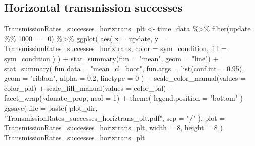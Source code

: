 \documentclass[
]{book}
\newenvironment{Shaded}{\begin{snugshade}}{\end{snugshade}}
\newcommand{\AttributeTok}[1]{\textcolor[rgb]{0.77,0.63,0.00}{#1}}
\newcommand{\DecValTok}[1]{\textcolor[rgb]{0.00,0.00,0.81}{#1}}
\newcommand{\FloatTok}[1]{\textcolor[rgb]{0.00,0.00,0.81}{#1}}
\newcommand{\FunctionTok}[1]{\textcolor[rgb]{0.00,0.00,0.00}{#1}}
\newcommand{\NormalTok}[1]{#1}
\newcommand{\OtherTok}[1]{\textcolor[rgb]{0.56,0.35,0.01}{#1}}
\newcommand{\SpecialCharTok}[1]{\textcolor[rgb]{0.00,0.00,0.00}{#1}}
\newcommand{\StringTok}[1]{\textcolor[rgb]{0.31,0.60,0.02}{#1}}
\begin{document}
\hypertarget{horizontal-transmission-successes-3}{%
\subsection{Horizontal transmission successes}\label{horizontal-transmission-successes-3}}

\begin{Shaded}
\begin{Highlighting}[]
\NormalTok{TransmissionRates\_successes\_horiztrans\_plt }\OtherTok{\textless{}{-}}\NormalTok{ time\_data }\SpecialCharTok{\%\textgreater{}\%}
  \FunctionTok{filter}\NormalTok{(update }\SpecialCharTok{\%\%} \DecValTok{1000} \SpecialCharTok{==} \DecValTok{0}\NormalTok{) }\SpecialCharTok{\%\textgreater{}\%}
  \FunctionTok{ggplot}\NormalTok{(}
    \FunctionTok{aes}\NormalTok{(}
      \AttributeTok{x =}\NormalTok{ update,}
      \AttributeTok{y =}\NormalTok{ TransmissionRates\_successes\_horiztrans,}
      \AttributeTok{color =}\NormalTok{ sym\_condition,}
      \AttributeTok{fill =}\NormalTok{ sym\_condition}
\NormalTok{    )}
\NormalTok{  ) }\SpecialCharTok{+}
  \FunctionTok{stat\_summary}\NormalTok{(}\AttributeTok{fun =} \StringTok{"mean"}\NormalTok{, }\AttributeTok{geom =} \StringTok{"line"}\NormalTok{) }\SpecialCharTok{+}
  \FunctionTok{stat\_summary}\NormalTok{(}
    \AttributeTok{fun.data =} \StringTok{"mean\_cl\_boot"}\NormalTok{,}
    \AttributeTok{fun.args =} \FunctionTok{list}\NormalTok{(}\AttributeTok{conf.int =} \FloatTok{0.95}\NormalTok{),}
    \AttributeTok{geom =} \StringTok{"ribbon"}\NormalTok{,}
    \AttributeTok{alpha =} \FloatTok{0.2}\NormalTok{,}
    \AttributeTok{linetype =} \DecValTok{0}
\NormalTok{  ) }\SpecialCharTok{+}
  \FunctionTok{scale\_color\_manual}\NormalTok{(}\AttributeTok{values =}\NormalTok{ color\_pal) }\SpecialCharTok{+}
  \FunctionTok{scale\_fill\_manual}\NormalTok{(}\AttributeTok{values =}\NormalTok{ color\_pal) }\SpecialCharTok{+}
  \FunctionTok{facet\_wrap}\NormalTok{(}\SpecialCharTok{\textasciitilde{}}\NormalTok{donate\_prop, }\AttributeTok{ncol =} \DecValTok{1}\NormalTok{) }\SpecialCharTok{+}
  \FunctionTok{theme}\NormalTok{(}
    \AttributeTok{legend.position =} \StringTok{"bottom"}
\NormalTok{  )}
\FunctionTok{ggsave}\NormalTok{(}
  \AttributeTok{file =} \FunctionTok{paste}\NormalTok{(}
\NormalTok{    plot\_dir,}
    \StringTok{"TransmissionRates\_successes\_horiztrans\_plt.pdf"}\NormalTok{,}
    \AttributeTok{sep =} \StringTok{"/"}
\NormalTok{  ),}
  \AttributeTok{plot =}\NormalTok{ TransmissionRates\_successes\_horiztrans\_plt,}
  \AttributeTok{width =} \DecValTok{8}\NormalTok{,}
  \AttributeTok{height =} \DecValTok{8}
\NormalTok{)}
\NormalTok{TransmissionRates\_successes\_horiztrans\_plt}
\end{Highlighting}
\end{Shaded}
\end{document}
